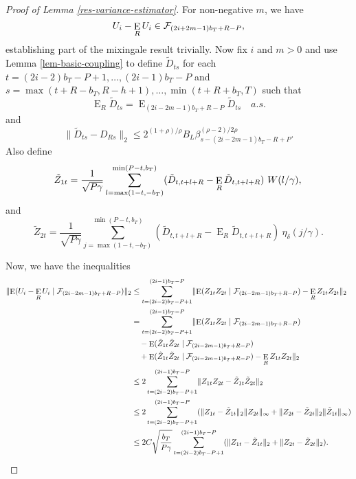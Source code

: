 \documentclass[11pt]{article}
\DeclareMathOperator{\E}{E}
\newcommand{\h}{h}
\newcommand{\kernelB}[1]{\ensuremath{\eta_{\delta}(#1)}}
\newcommand{\vtSuma}{\ensuremath{\sum_{t=(2i-2)b_T-P+1}^{(2i-1)b_T-P}}}
\newcommand{\vttLower}{\ensuremath{\max(1-t,-b_T)}}
\newcommand{\vttUpper}{\ensuremath{\min(P-t,b_T)}}
\newcommand{\couplingConstant}{\ensuremath{2^{(1+\rho)/\rho} B_L}}
\newcommand{\couplingBeta}[1]{\ensuremath{\beta^{(\rho-2)/2\rho}_{#1}}}
\newcommand{\couplingBound}[1]{\couplingConstant \couplingBeta{#1}}
\begin{document}
\begin{proof}[Proof of Lemma \ref{res-variance-estimator}]
For non-negative $m$, we have 
\begin{equation*}
U_i - \E_R U_i \in \UFiltration{2i+2m-1},
\end{equation*}
establishing part of the mixingale result trivially.  Now fix $i$ and $m >
0$ and use Lemma \ref{lem-basic-coupling} to define $\tilde{D}_{ts}$
for each $t =(2i-2)b_T-P+1,\dots,(2i-1)b_T-P$ and $s =
\max(t+R-b_T,R-\h+1),\dots,\min(t+R+b_T,T)$ such that
\begin{equation*}
 \E_R \tilde D_{ts} = \E_{(2i-2m-1)b_T+R-P} \tilde D_{ts} \quad a.s.
\end{equation*}
and
\begin{equation*}
  \lVert \tilde D_{ts} - D_{Rs} \rVert_2 \leq \couplingBound{s - (2i-2m-1)b_T-R+P}.
\end{equation*}
Also define
\begin{equation*}
  \tilde Z_{1t} = \frac1{\sqrt{P\gamma}} \sum_{l=\vttLower}^{\vttUpper}
  (\tilde D_{t,t+l+R} - \E_R\tilde D_{t,t+l+R})\ W(l/\gamma), \\
\end{equation*}
and
\begin{equation*}
\tilde Z_{2t} = \frac1{\sqrt{P\gamma}} \sum_{j=\vttLower}^{\vttUpper}
    (\tilde D_{t,t+l+R} - \E_R\tilde D_{t,t+l+R})\ \kernelB{j/\gamma}.
\end{equation*}

Now, we have the inequalities
\begin{align*}
  \lVert \E( U_i - \E_R U_i \mid \UFiltration{2i-2m-1}) \rVert_2
  &\leq
  \vtSuma \lVert \E(Z_{1t}Z_{2t} \mid \UFiltration{2i-2m-1}) - \E_R
  Z_{1t}Z_{2t} \rVert_2 \\
  &= \vtSuma \lVert \E(Z_{1t}Z_{2t} \mid \UFiltration{2i-2m-1}) \\
  &\quad - \E(\tilde{Z}_{1t}\tilde{Z}_{2t} \mid \UFiltration{2i-2m-1}) \\
  &\quad + \E(\tilde{Z}_{1t}\tilde{Z}_{2t} \mid \UFiltration{2i-2m-1})
  - \E_R Z_{1t}Z_{2t} \rVert_2 \\
  &\leq 2 \vtSuma \lVert Z_{1t} Z_{2t} - \tilde Z_{1t} \tilde{Z}_{2t}
  \rVert_2 \\
  &\leq 2 \vtSuma (\lVert Z_{1t} - \tilde{Z}_{1t} \rVert_2 \lVert
  Z_{2t} \rVert_{\infty}
  + \lVert Z_{2t} - \tilde{Z}_{2t} \rVert_2 \lVert \tilde{Z}_{1t} \rVert_{\infty}) \\
  &\leq 2 C \sqrt{\frac{b_T}{P\gamma}} \vtSuma (\lVert Z_{1t} - \tilde{Z}_{1t} \rVert_2 
  + \lVert Z_{2t} - \tilde{Z}_{2t} \rVert_2).
\end{align*}


\end{proof}
\end{document}
